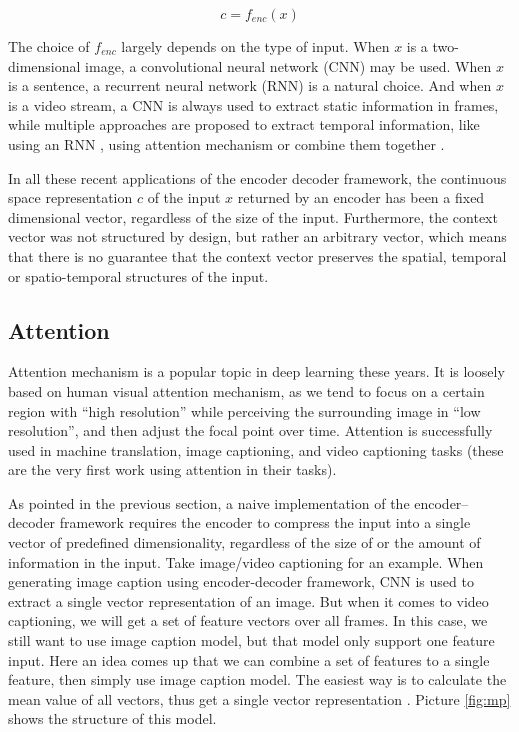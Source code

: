 \begin{equation}
c=f_{enc}(x)
\end{equation}

The choice of $f_{enc}$ largely depends on the type of input. When $x$ is a two-dimensional image, a convolutional neural network (CNN) may be used. When $x$ is a sentence, a recurrent neural network (RNN) is a natural choice. And when $x$ is a video stream, a CNN is always used to extract static information in frames, while multiple approaches are proposed to extract temporal information, like using an RNN \cite{venugopalan2015sequence}, using attention mechanism \cite{yao2015describing} or combine them together \cite{pan2015hierarchical}.

In all these recent applications of the encoder decoder framework, the continuous space representation $c$ of the input $x$ returned by an encoder has been a fixed dimensional vector, regardless of the size of the input. Furthermore, the context vector was not structured by design, but rather an arbitrary vector, which means that there is no guarantee that the context vector preserves the spatial, temporal or spatio-temporal structures of the input.

\subsection{Attention}
Attention mechanism is a popular topic in deep learning these years. It is loosely based on human visual attention mechanism, as we tend to focus on a certain region with “high resolution” while perceiving the surrounding image in “low resolution”, and then adjust the focal point over time. Attention is successfully used in machine translation\cite{bahdanau2014neural}, image captioning\cite{xu2015show}, and video captioning\cite{venugopalan2014translating} tasks (these are the very first work using attention in their tasks).

As pointed in the previous section, a naive implementation of the encoder–decoder framework requires the encoder to compress the input into a single vector of predefined dimensionality, regardless of the size of or the amount of information in the input. Take image/video captioning for an example. When generating image caption using encoder-decoder framework, CNN is used to extract a single vector representation of an image. But when it comes to video captioning, we will get a set of feature vectors over all frames. In this case, we still want to use image caption model, but that model only support one feature input. Here an idea comes up that we can combine a set of features to a single feature, then simply use image caption model. The easiest way is to calculate the mean value of all vectors, thus get a single vector representation \cite{venugopalan2014translating}. Picture \ref{fig:mp} shows the structure of this model.

